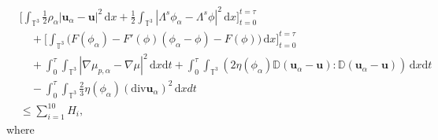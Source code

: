 \documentclass[reqno,a4paper,11pt]{amsart}
\theoremstyle{plain}
\numberwithin{equation}{section}
\renewcommand{\d}{\mathrm{d}}
\newcommand{\dx}{\d x}
\newcommand{\dxdt}{\,\d x \d t}
\newcommand{\dt}{\d t}
\begin{document}
				\begin{align}
					\label{mode54-221}
					& \nonumber \bigg[\int_{\mathbb{T}^{3}}\frac{1}{2}\rho_{\alpha} |\mathbf{u}_{\alpha}-\mathbf{u}|^{2}\,\dx+\frac{1}{2}\int_{\mathbb{T}^{3}} |\Lambda^{s}\phi_{\alpha} - \Lambda^{s}\phi|^{2}\,\mathrm dx\bigg]_{t=0}^{t=\tau}
					\\&\quad\nonumber
					+\bigg[\int_{\mathbb{T}^{3}}\big(F(\phi_{\alpha})- F'(\phi)(\phi_{\alpha}-\phi)-F(\phi)\big)\,\dx\bigg]_{t=0}^{t=\tau}
					\\&\quad\nonumber+\int_0^{\tau}\int_{\mathbb{T}^{3}}|\nabla \mu_{p,\alpha}-\nabla \mu|^{2}\dxdt
					+ \int_0^\tau\int_{\mathbb{T}^{3}} (2\eta(\phi_{\alpha}) \mathbb{ D}(\mathbf{u}_{\alpha}-\mathbf{u}): \mathbb{ D}(\mathbf{u}_{\alpha}-\mathbf{u}))\,\dx\dt
					\\&\quad\nonumber-\int_0^{\tau}\int_{\mathbb{T}^{3}}  \frac{2}{3}\eta(\phi_{\alpha}) (\mathrm{div} \mathbf{u}_{\alpha})^2\, \mathrm{d} xdt
					\\&\leq \sum_{i=1}^{10}H_{i},
				\end{align}
				where
\end{document}
